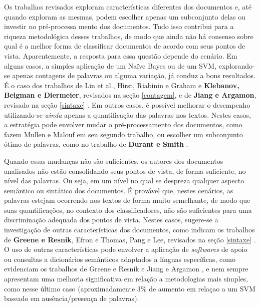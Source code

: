 Os trabalhos revisados exploram características diferentes dos documentos e, até quando exploram as mesmas, podem escolher apenas um subconjunto delas ou investir no pré-processa mento dos documentos. Tudo isso contribui para a riqueza metodológica desses trabalhos, de modo que ainda não há consenso sobre qual é a melhor forma de classificar documentos de acordo com seus pontos de vista. Aparentemente, a resposta para essa questão depende do cenário. Em alguns casos, a simples aplicação de um Naïve Bayes ou de um SVM, explorando-se apenas contagens de palavras ou alguma variação, já conduz a bons resultados. É o caso dos trabalhos de Lin et al., Hirst, Riabinin e Graham e \textbf{Klebanov, Beigman e Diermeier}, revisados na seção \ref{contagem}, e de \textbf{Jiang e Argamon}, revisado na seção \ref{sintaxe} \cite{lin-et-al2006, hirst-et-al, klebanov, jiang-argamon}. Em outros casos, é possível melhorar o desempenho utilizando-se \emph{ainda} apenas a quantificação das palavras nos textos. Nestes casos, a estratégia pode envolver mudar o pré-processamento dos documentos, como fazem Mullen e Malouf em seu segundo trabalho, ou escolher um subconjunto ótimo de palavras, como no trabalho de \textbf{Durant e Smith} \cite{malouf-taking_sides, durant-smith}.

Quando essas mudanças não são suficientes, os autores dos documentos analisados não estão consolidando seus pontos de vista, de forma suficiente, no nível das palavras. Ou seja, em um nível no qual se despreza qualquer aspecto semântico ou sintático dos documentos. É provável que, nestes cenários,  as palavras estejam ocorrendo nos textos de forma muito semelhante, de modo que suas quantificações, no contexto dos classificadores, não são suficientes para uma discriminação adequada dos pontos de vista. Nestes casos, sugere-se a investigação de outras características dos documentos, como indicam os trabalhos de \textbf{Greene e Resnik}, Efron e Thomas, Pang e Lee, revisados na seção \ref{sintaxe} \cite{greene, efron, get-out-the-vote}. O uso de outras características pode envolver a aplicação de \emph{softwares} de apoio ou consultas a dicionários semânticos adaptados a línguas específicas, como evidenciam os trabalhos de Greene e Resnik \cite{greene} e Jiang e Argamon \cite{jiang-argamon}, e nem sempre apresentam uma melhoria significativa em relação a metodologias mais simples, como nesse último caso (aproximadamente 3\% de aumento em relaçao a um SVM baseado em ausência/presença de palavras). %
 


